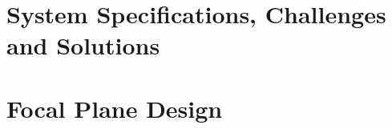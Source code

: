 \documentclass[12pt,letterpaper]{memoir}
\numberwithin{equation}{chapter}
\numberwithin{figure}{chapter}
\numberwithin{table}{chapter}
\begin{document}
\chapter{System Specifications, Challenges and Solutions}\label{c:specs}







\chapter{Focal Plane Design}\label{c:fp-design}









\printbibliography
\end{document}

